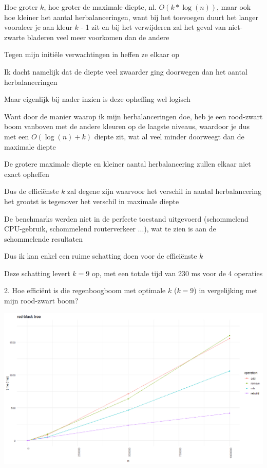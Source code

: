 \documentclass{article}
\begin{document}
Hoe groter $k$, hoe groter de maximale diepte, nl. $O(k * \log (n))$, maar ook hoe kleiner het aantal herbalanceringen, want bij het toevoegen duurt het langer vooraleer je aan kleur $k$ - 1 zit en bij het verwijderen zal het geval van niet-zwarte bladeren veel meer voorkomen dan de andere

Tegen mijn initiële verwachtingen in heffen ze elkaar op

Ik dacht namelijk dat de diepte veel zwaarder ging doorwegen dan het aantal herbalanceringen

Maar eigenlijk bij nader inzien is deze opheffing wel logisch

Want door de manier waarop ik mijn herbalanceringen doe, heb je een rood-zwart boom vanboven met de andere kleuren op de laagste niveaus, waardoor je dus met een $O(\log(n) + k)$ diepte zit, wat al veel minder doorweegt dan de maximale diepte

\vspace{0.2cm}

De grotere maximale diepte en kleiner aantal herbalancering zullen elkaar niet exact opheffen

Dus de efficiënste $k$ zal degene zijn waarvoor het verschil in aantal herbalancering het grootst is tegenover het verschil in maximale diepte

De benchmarks werden niet in de perfecte toestand uitgevoerd (schommelend CPU-gebruik, schommelend routerverkeer ...), wat te zien is aan de schommelende resultaten

Dus ik kan enkel een ruime schatting doen voor de efficiënste $k$

Deze schatting levert $k = 9$ op, met een totale tijd van 230 ms voor de 4 operaties

\newpage

\Large
2. Hoe efficiënt is die regenboogboom met optimale $k$ ($k = 9$) in vergelijking met mijn rood-zwart boom?

\vspace{0.2cm}

\includegraphics[width=1\textwidth]{benchmark_rainbow_vs_redblack_0.png}
\end{document}
